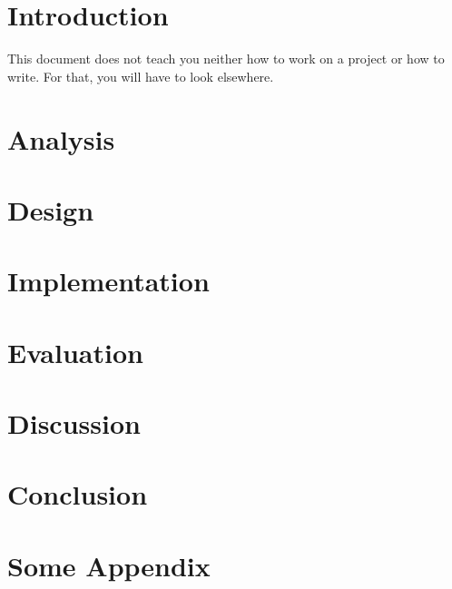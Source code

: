 \documentclass[a4paper, oneside]{memoir}
\begin{document}
\maketitle
\newpage
\setcounter{tocdepth}{2}
\tableofcontents
\newpage
\listoffigures

\chapter{Introduction}

This document does not teach you neither how to work on a project or how to write. For that, you will have to look elsewhere\cite{reportwriting}.

\chapter{Analysis}
\chapter{Design}
\chapter{Implementation}
\chapter{Evaluation}
\chapter{Discussion}
\chapter{Conclusion}

\appendix
\chapter{Some Appendix}
\printbibliography
\end{document}
